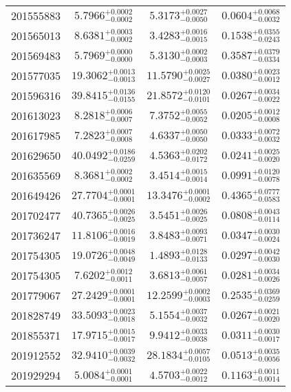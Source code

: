 \begin{tabular}{cccc}
201555883 & $5.7966_{-0.0002}^{+0.0002}$ & $5.3173_{-0.0050}^{+0.0027}$ & $0.0604_{-0.0032}^{+0.0068}$ \\
201565013 & $8.6381_{-0.0002}^{+0.0003}$ & $3.4283_{-0.0015}^{+0.0016}$ & $0.1538_{-0.0243}^{+0.0355}$ \\
201569483 & $5.7969_{-0.0000}^{+0.0000}$ & $5.3130_{-0.0003}^{+0.0002}$ & $0.3587_{-0.0334}^{+0.0379}$ \\
201577035 & $19.3062_{-0.0013}^{+0.0013}$ & $11.5790_{-0.0027}^{+0.0025}$ & $0.0380_{-0.0012}^{+0.0023}$ \\
201596316 & $39.8415_{-0.0155}^{+0.0136}$ & $21.8572_{-0.0101}^{+0.0120}$ & $0.0267_{-0.0022}^{+0.0034}$ \\
201613023 & $8.2818_{-0.0007}^{+0.0006}$ & $7.3752_{-0.0052}^{+0.0055}$ & $0.0205_{-0.0008}^{+0.0012}$ \\
201617985 & $7.2823_{-0.0008}^{+0.0007}$ & $4.6337_{-0.0050}^{+0.0050}$ & $0.0333_{-0.0032}^{+0.0072}$ \\
201629650 & $40.0492_{-0.0259}^{+0.0186}$ & $4.5363_{-0.0172}^{+0.0202}$ & $0.0241_{-0.0020}^{+0.0025}$ \\
201635569 & $8.3681_{-0.0002}^{+0.0002}$ & $3.4514_{-0.0014}^{+0.0015}$ & $0.0991_{-0.0078}^{+0.0120}$ \\
201649426 & $27.7704_{-0.0001}^{+0.0001}$ & $13.3476_{-0.0002}^{+0.0001}$ & $0.4365_{-0.0583}^{+0.0777}$ \\
201702477 & $40.7365_{-0.0025}^{+0.0026}$ & $3.5451_{-0.0025}^{+0.0026}$ & $0.0808_{-0.0114}^{+0.0043}$ \\
201736247 & $11.8106_{-0.0019}^{+0.0016}$ & $3.8483_{-0.0071}^{+0.0093}$ & $0.0347_{-0.0024}^{+0.0030}$ \\
201754305 & $19.0726_{-0.0049}^{+0.0048}$ & $1.4893_{-0.0133}^{+0.0128}$ & $0.0297_{-0.0030}^{+0.0042}$ \\
201754305 & $7.6202_{-0.0011}^{+0.0012}$ & $3.6813_{-0.0057}^{+0.0061}$ & $0.0281_{-0.0026}^{+0.0034}$ \\
201779067 & $27.2429_{-0.0001}^{+0.0001}$ & $12.2599_{-0.0003}^{+0.0002}$ & $0.2535_{-0.0259}^{+0.0369}$ \\
201828749 & $33.5093_{-0.0018}^{+0.0023}$ & $5.1554_{-0.0032}^{+0.0037}$ & $0.0267_{-0.0020}^{+0.0021}$ \\
201855371 & $17.9715_{-0.0017}^{+0.0015}$ & $9.9412_{-0.0038}^{+0.0033}$ & $0.0311_{-0.0017}^{+0.0030}$ \\
201912552 & $32.9410_{-0.0032}^{+0.0039}$ & $28.1834_{-0.0105}^{+0.0057}$ & $0.0513_{-0.0056}^{+0.0035}$ \\
201929294 & $5.0084_{-0.0001}^{+0.0001}$ & $4.5703_{-0.0012}^{+0.0022}$ & $0.1163_{-0.0014}^{+0.0011}$ \\
\bottomrule
\end{tabular}
